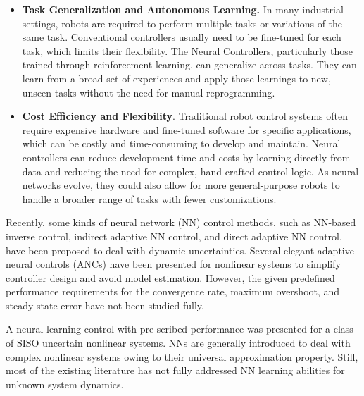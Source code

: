 \begin{itemize}
  increasingly equipped with advanced sensors, including vision systems,
  force-torque sensors, and haptic feedback devices. Traditional
  controllers often have difficulty integrating and making real-time
  decisions based on this flood of sensory data. The Neural Controllers
  are highly effective at processing large amounts of sensor data, such
  as camera inputs, LiDAR, or touch sensors. This ability enables robots
  to adjust their behavior based on rich sensory input.
\item
  \textbf{Task Generalization and Autonomous Learning.} In many
  industrial settings, robots are required to perform multiple tasks or
  variations of the same task. Conventional controllers usually need to
  be fine-tuned for each task, which limits their flexibility. The
  Neural Controllers, particularly those trained through reinforcement
  learning, can generalize across tasks. They can learn from a broad set
  of experiences and apply those learnings to new, unseen tasks without
  the need for manual reprogramming.
\item
  \textbf{Cost Efficiency and Flexibility}. Traditional robot control
  systems often require expensive hardware and fine-tuned software for
  specific applications, which can be costly and time-consuming to
  develop and maintain. Neural controllers can reduce development time
  and costs by learning directly from data and reducing the need for
  complex, hand-crafted control logic. As neural networks evolve, they
  could also allow for more general-purpose robots to handle a broader
  range of tasks with fewer customizations.
\end{itemize}

Recently, some kinds of neural network (NN) control methods, such as
NN-based inverse control, indirect adaptive NN control, and direct
adaptive NN control, have been proposed to deal with dynamic
uncertainties. Several elegant adaptive neural controls (ANCs) have been
presented for nonlinear systems to simplify controller design and avoid
model estimation. However, the given predefined performance requirements
for the convergence rate, maximum overshoot, and steady-state error have
not been studied fully.

A neural learning control with pre-scribed performance was presented for
a class of SISO uncertain nonlinear systems. NNs are generally
introduced to deal with complex nonlinear systems owing to their
universal approximation property. Still, most of the existing literature
has not fully addressed NN learning abilities for unknown system
dynamics.

